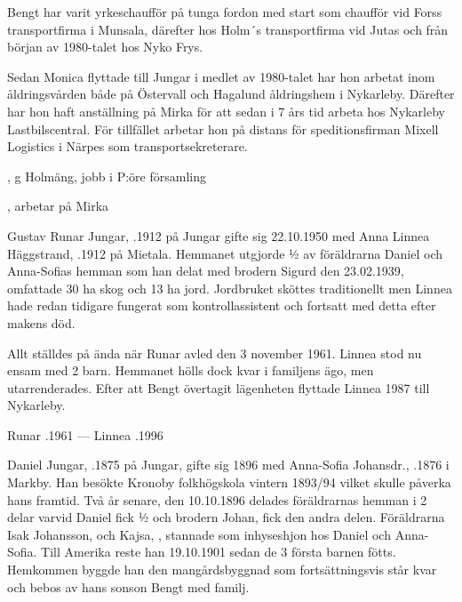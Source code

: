 Bengt har varit yrkeschaufför på tunga fordon med start som chaufför vid Forss transportfirma i Munsala, därefter hos Holm´s transportfirma vid Jutas och från början av 1980-talet hos Nyko Frys.

Sedan Monica flyttade till Jungar i medlet av 1980-talet har hon arbetat inom åldringsvården både på Östervall och Hagalund åldringshem i Nykarleby. Därefter har hon haft anställning på Mirka för att sedan i 7 års tid arbeta hos Nykarleby Lastbilscentral. För tillfället arbetar hon på distans för speditionsfirman Mixell Logistics i Närpes som transportsekreterare.
\begin{jhchildren}
  \item {}, g Holmäng, jobb i P:öre församling
  \item {}, arbetar på Mirka
\end{jhchildren}


%
Gustav Runar Jungar, .1912 på Jungar gifte sig 22.10.1950 med Anna Linnea Häggstrand, .1912 på Mietala. Hemmanet utgjorde ½ av föräldrarna Daniel och Anna-Sofias hemman som han delat med brodern Sigurd den 23.02.1939, omfattade 30 ha skog och 13 ha jord. Jordbruket sköttes traditionellt men Linnea hade redan tidigare fungerat som kontrollassistent och fortsatt med detta efter makens död.

Allt ställdes på ända när Runar avled den 3 november 1961. Linnea stod nu ensam med 2 barn. Hemmanet hölls dock kvar i familjens ägo, men utarrenderades. Efter att Bengt övertagit lägenheten flyttade Linnea 1987 till Nykarleby.
\begin{jhchildren}
  \item {}
  \item {}
\end{jhchildren}

Runar .1961  ---  Linnea .1996



%
Daniel Jungar, .1875 på Jungar, gifte sig 1896 med Anna-Sofia Johansdr., .1876 i Markby. Han besökte Kronoby folkhögskola vintern 1893/94 vilket skulle påverka hans framtid. Två år senare, den 10.10.1896 delades föräldrarnas hemman i 2 delar varvid Daniel fick ½ och brodern Johan,  fick den andra delen. Föräldrarna Isak Johansson,  och Kajsa, , stannade som inhyseshjon hos Daniel och Anna-Sofia. Till Amerika reste han 19.10.1901 sedan de 3 första barnen fötts. Hemkommen byggde han den mangårdsbyggnad som fortsättningsvis står kvar och bebos av hans sonson Bengt med familj.

